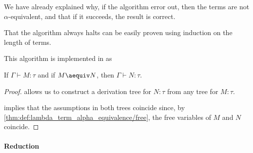 \begin{defproof}
  We have already explained why, if the algorithm error out, then the terms are not \( \alpha \)-equivalent, and that if it succeeds, the result is correct.

  That the algorithm always halts can be easily proven using induction on the length of terms.
\end{defproof}
\begin{comments}
  \item This algorithm is implemented in \cite{notebook:code} as
  \begin{CodeRefDisplay}
  \end{CodeRefDisplay}
\end{comments}

\begin{proposition}\label{thm:alpha_equivalent_term_typing}
  If \( \Gamma \vdash M: \tau \) and if \( M \aequiv N \), then \( \Gamma \vdash N: \tau \).
\end{proposition}
\begin{proof}
   allows us to construct a derivation tree for \( N: \tau \) from any tree for \( M: \tau \).

   implies that the assumptions in both trees coincide since, by \cref{thm:def:lambda_term_alpha_equivalence/free}, the free variables of \( M \) and \( N \) coincide.
\end{proof}

\paragraph{Reduction}

